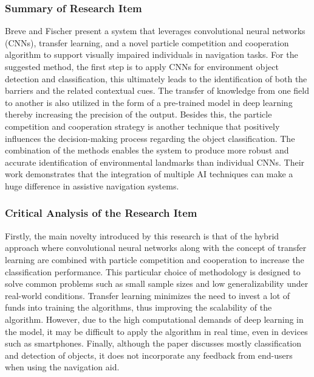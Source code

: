 \documentclass{FastFyp}
\begin{document}
\subsubsection{Summary of Research Item}  
Breve and Fischer \cite{ref:breve2020visually} present a system that leverages convolutional neural networks (CNNs), transfer learning, and a novel particle competition and cooperation algorithm to support visually impaired individuals in navigation tasks. For the suggested method, the first step is to apply CNNs for environment object detection and classification, this ultimately leads to the identification of both the barriers and the related contextual cues. The transfer of knowledge from one field to another is also utilized in the form of a pre-trained model in deep learning thereby increasing the precision of the output. Besides this, the particle competition and cooperation strategy is another technique that positively influences the decision-making process regarding the object classification. The combination of the methods enables the system to produce more robust and accurate identification of environmental landmarks than individual CNNs. Their work demonstrates that the integration of multiple AI techniques can make a huge difference in assistive navigation systems.

\subsubsection{Critical Analysis of the Research Item}  
Firstly, the main novelty introduced by this research is that of the hybrid approach where convolutional neural networks along with the concept of transfer learning are combined with particle competition and cooperation to increase the classification performance. This particular choice of methodology is designed to solve common problems such as small sample sizes and low generalizability under real-world conditions. Transfer learning minimizes the need to invest a lot of funds into training the algorithms, thus improving the scalability of the algorithm. However, due to the high computational demands of deep learning in the model, it may be difficult to apply the algorithm in real time, even in devices such as smartphones. Finally, although the paper discusses mostly classification and detection of objects, it does not incorporate any feedback from end-users when using the navigation aid.
\end{document}
